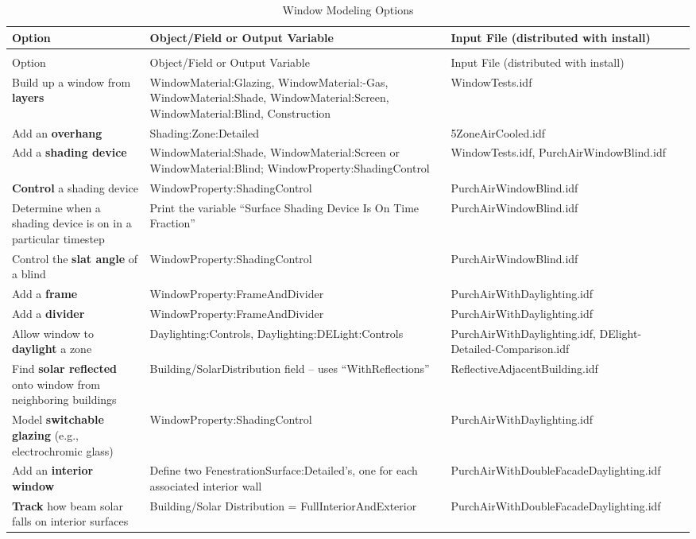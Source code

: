 \begin{longtable}[c]{p{2.0in}p{2.0in}p{2.0in}}
\caption{Window Modeling Options \label{table:window-modeling-options}} \tabularnewline
\toprule
Option & Object/Field or Output Variable & Input File (distributed with install) \tabularnewline
\midrule
\endfirsthead

\caption[]{Window Modeling Options} \tabularnewline
\toprule
Option & Object/Field or Output Variable & Input File (distributed with install) \tabularnewline
\midrule
\endhead

Build up a window from \textbf{layers} & Window\-Material:\-Glazing, Window\-Material:-Gas, Window\-Material:\-Shade, Window\-Material:\-Screen, Window\-Material:\-Blind, Construction & Window\-Tests.idf \tabularnewline
Add an \textbf{overhang} & Shading:\-Zone:\-Detailed & 5Zone\-Air\-Cooled.idf \tabularnewline
Add a \textbf{shading device} & Window\-Material:\-Shade, Window\-Material:\-Screen or Window\-Material:\-Blind; Window\-Property:\-Shading\-Control & Window\-Tests.idf, Purch\-Air\-Window\-Blind.idf \tabularnewline
\textbf{Control} a shading device & Window\-Property:\-Shading\-Control & Purch\-Air\-WindowBlind.idf \tabularnewline
Determine when a shading device is on in a particular timestep & Print the variable ``Surface Shading Device Is On Time Fraction'' & Purch\-Air\-Window\-Blind.idf \tabularnewline
Control the \textbf{slat angle} of a blind & Window\-Property:\-Shading\-Control & Purch\-Air\-Window\-Blind.idf \tabularnewline
Add a \textbf{frame} & Window\-Property:\-FrameAndDivider & Purch\-Air\-With\-Day\-lighting.idf \tabularnewline
Add a \textbf{divider} & Window\-Property:\-Frame\-And\-Divider & Purch\-Air\-With\-Day\-lighting.idf \tabularnewline
Allow window to \textbf{daylight} a zone & Day\-lighting:Controls, Day\-lighting:\-DELight:\-Controls & Purch\-Air\-With\-Day\-lighting.idf, DElight-\-Detailed-\-Comparison.idf \tabularnewline
Find \textbf{solar reflected} onto window from neighboring buildings & Building/\-Solar\-Distribution field – uses ``WithReflections'' & Reflective\-Adjacent\-Building.idf \tabularnewline
Model \textbf{switchable glazing} (e.g., electrochromic glass) & Window\-Property:\-Shading\-Control & Purch\-Air\-With\-Day\-lighting.idf \tabularnewline
Add an \textbf{interior window} & Define two Fenestration\-Surface:\-Detailed's, one for each associated interior wall & Purch\-Air\-With\-Double\-Facade\-Day\-lighting.idf \tabularnewline
\textbf{Track} how beam solar falls on interior surfaces & Building/\-Solar Distribution = Full\-Interior\-And\-Exterior & Purch\-Air\-With\-Double\-Facade\-Day\-lighting.idf \tabularnewline

\end{longtable}
